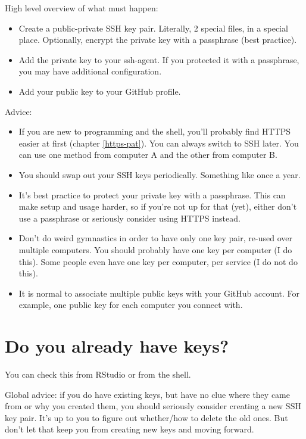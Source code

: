\documentclass[
]{book}
\providecommand{\tightlist}{%
  \setlength{\itemsep}{0pt}\setlength{\parskip}{0pt}}
\begin{document}
High level overview of what must happen:

\begin{itemize}
\tightlist
\item
  Create a public-private SSH key pair. Literally, 2 special files, in a special place. Optionally, encrypt the private key with a passphrase (best practice).
\item
  Add the private key to your ssh-agent. If you protected it with a passphrase, you may have additional configuration.
\item
  Add your public key to your GitHub profile.
\end{itemize}

Advice:

\begin{itemize}
\tightlist
\item
  If you are new to programming and the shell, you'll probably find HTTPS easier at first (chapter \ref{https-pat}). You can always switch to SSH later. You can use one method from computer A and the other from computer B.
\item
  You should swap out your SSH keys periodically. Something like once a year.
\item
  It's best practice to protect your private key with a passphrase. This can make setup and usage harder, so if you're not up for that (yet), either don't use a passphrase or seriously consider using HTTPS instead.
\item
  Don't do weird gymnastics in order to have only one key pair, re-used over multiple computers. You should probably have one key per computer (I do this). Some people even have one key per computer, per service (I do not do this).
\item
  It is normal to associate multiple public keys with your GitHub account. For example, one public key for each computer you connect with.
\end{itemize}

\section{Do you already have keys?}\label{do-you-already-have-keys}

You can check this from RStudio or from the shell.

Global advice: if you do have existing keys, but have no clue where they came from or why you created them, you should seriously consider creating a new SSH key pair. It's up to you to figure out whether/how to delete the old ones. But don't let that keep you from creating new keys and moving forward.
\end{document}
